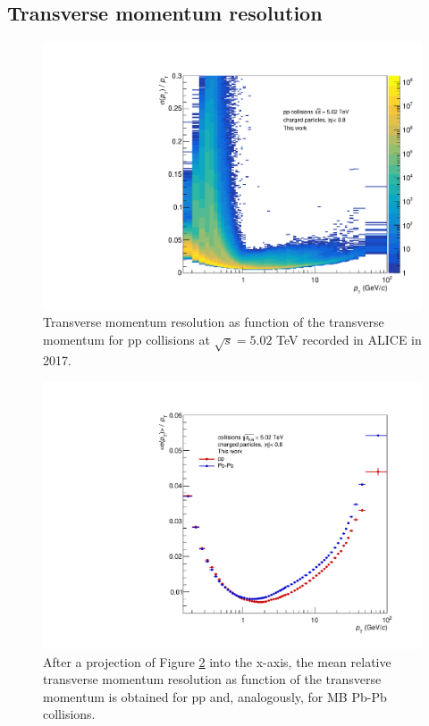 \documentclass[12pt,a4paper]{report}
\begin{document}
\subsection{Transverse momentum resolution}
\begin{figure}[tb!]
\centering
\includegraphics[width=12cm]{Plots/ptReso2D.pdf}  
\caption{Transverse momentum resolution as function of the transverse momentum for pp collisions at $\sqrt{s} = 5.02$ TeV recorded in ALICE in 2017.}
\label{ptReso1D}
\end{figure}
\begin{figure}[tb!]
\centering
\includegraphics[width=12cm]{Plots/ptReso1D.pdf}  
\caption{After a projection of Figure \ref{ptReso2D} into the x-axis, the mean relative transverse momentum resolution as function of the transverse momentum is obtained for pp and, analogously, for MB Pb-Pb collisions.}
\label{ptReso2D}
\end{figure}
\end{document}
